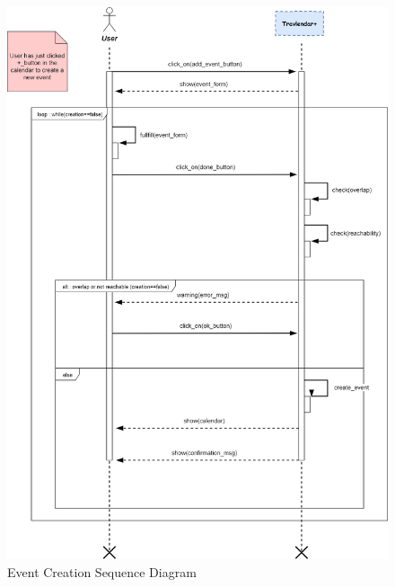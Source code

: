 \newpage
{}
\begin{figure}[H]
	\centering
	\includegraphics[scale=0.3]{Images/Sequence/Event_Creation}
	\caption{Event Creation Sequence Diagram}
\end{figure}

